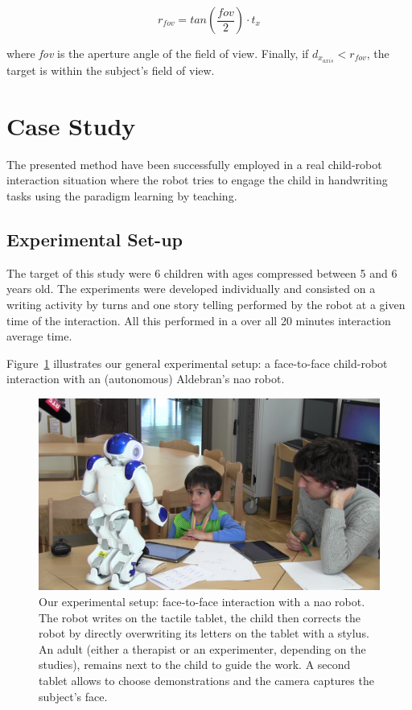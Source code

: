 \documentclass{sig-alternate}
\begin{document}
\begin{equation}
r_{fov} = tan\left(\frac{fov}{2}\right) \cdot t_x
\label{eq:fovtf}
\end{equation}

where \textit{fov} is the aperture angle of the field of view. Finally, if $ d_{x_{axis}}<r_{fov} $, the target is within the subject's field of view.


\section{Case Study}
The presented method have been successfully employed in a real child-robot interaction situation where the robot tries to engage the child in handwriting tasks using the paradigm learning by teaching.
\subsection{Experimental Set-up}

The target of this study were 6 children with ages compressed between 5 and 6 years old. The experiments were developed individually and consisted on a writing activity by turns and one story telling performed by the robot at a given time of the interaction. All this performed in a over all 20 minutes interaction average time.

Figure~\ref{fig:realSetup} illustrates our general experimental setup: a
face-to-face child-robot interaction with an (autonomous) Aldebran's {\sc nao}
robot.

\begin{figure}[h!]
    \centering
    \includegraphics[width=1\columnwidth]{realSetup}
    \caption{\small Our experimental setup: face-to-face interaction with a {\sc
            nao} robot.  The robot writes on the tactile tablet, the child then
            corrects the robot by directly overwriting its letters on the tablet
            with a stylus. An adult (either a therapist or an experimenter,
            depending on the studies), remains next to the child to guide the work. 
            A second tablet allows to choose demonstrations and the camera captures the subject's face.}
    \label{fig:realSetup}
\end{figure}
\end{document}
